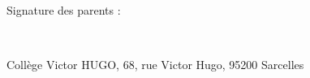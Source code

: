 \documentclass{article}
\begin{document}
    \begin{minipage}[t]{.15\linewidth}
    \end{minipage} \hfill
    \begin{minipage}[t]{.15\linewidth}
    \end{minipage} ~\\ \vfill
    \noindent 
    \begin{minipage}[t]{.4\linewidth}
    \end{minipage}\hfill
    \begin{minipage}[t]{.6\linewidth}
        Signature des parents : %
    \end{minipage}
    \vfill ~\vfill
    \begin{center}
        \scriptsize Collège Victor HUGO, 68, rue Victor Hugo, 95200 Sarcelles
    \end{center}
    
\end{document}
